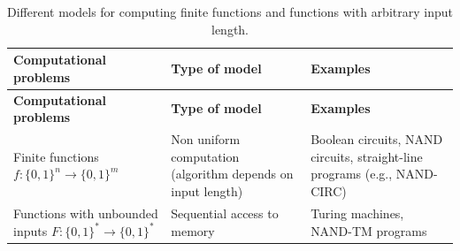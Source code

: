 \begin{longtable}[]{@{}lll@{}}
\caption{Different models for computing finite functions and functions
with arbitrary input length.}\tabularnewline
\toprule
\begin{minipage}[b]{0.31\columnwidth}\raggedright
\textbf{Computational problems}\strut
\end{minipage} & \begin{minipage}[b]{0.27\columnwidth}\raggedright
\textbf{Type of model}\strut
\end{minipage} & \begin{minipage}[b]{0.33\columnwidth}\raggedright
\textbf{Examples}\strut
\end{minipage}\tabularnewline
\midrule
\endfirsthead
\toprule
\begin{minipage}[b]{0.31\columnwidth}\raggedright
\textbf{Computational problems}\strut
\end{minipage} & \begin{minipage}[b]{0.27\columnwidth}\raggedright
\textbf{Type of model}\strut
\end{minipage} & \begin{minipage}[b]{0.33\columnwidth}\raggedright
\textbf{Examples}\strut
\end{minipage}\tabularnewline
\midrule
\endhead
\begin{minipage}[t]{0.31\columnwidth}\raggedright
Finite functions \(f:\{0,1\}^n \rightarrow \{0,1\}^m\)\strut
\end{minipage} & \begin{minipage}[t]{0.27\columnwidth}\raggedright
Non uniform computation (algorithm depends on input length)\strut
\end{minipage} & \begin{minipage}[t]{0.33\columnwidth}\raggedright
Boolean circuits, NAND circuits, straight-line programs (e.g.,
NAND-CIRC)\strut
\end{minipage}\tabularnewline
\begin{minipage}[t]{0.31\columnwidth}\raggedright
Functions with unbounded inputs
\(F:\{0,1\}^* \rightarrow \{0,1\}^*\)\strut
\end{minipage} & \begin{minipage}[t]{0.27\columnwidth}\raggedright
Sequential access to memory\strut
\end{minipage} & \begin{minipage}[t]{0.33\columnwidth}\raggedright
Turing machines, NAND-TM programs\strut
\end{minipage}\tabularnewline

\end{longtable}
